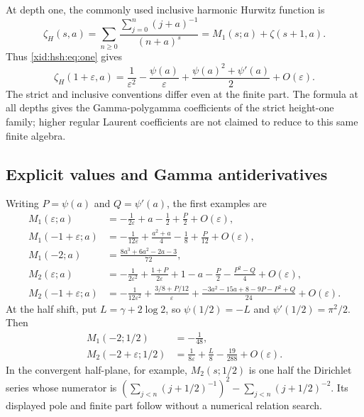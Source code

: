 \documentclass[11pt,a4paper]{article}
\numberwithin{equation}{section}
\theoremstyle{definition}
\theoremstyle{remark}
\begin{document}
At depth one, the commonly used inclusive harmonic Hurwitz function is
\[
 \zeta_H(s,a)=\sum_{n\ge0}\frac{\sum_{j=0}^{n}(j+a)^{-1}}{(n+a)^s}
            =M_1(s;a)+\zeta(s+1,a).
\]
Thus \eqref{xid:hsh:eq:one} gives
\[
 \zeta_H(1+\varepsilon,a)
 =\frac1{\varepsilon^2}-\frac{\psi(a)}{\varepsilon}
       +\frac{\psi(a)^2+\psi'(a)}2+O(\varepsilon).
\]
The strict and inclusive conventions differ even at the finite part.
The formula at all depths gives the Gamma-polygamma coefficients of the
strict height-one family; higher regular Laurent coefficients are not
claimed to reduce to this same finite algebra.

\subsection{Explicit values and Gamma antiderivatives}

Writing $P=\psi(a)$ and $Q=\psi'(a)$, the first examples are
\begin{align}
 M_1(\varepsilon;a)
  &=-\frac1{2\varepsilon}+a-\frac12+\frac P2+O(\varepsilon),
       \label{xid:hsh:eq:M10}\\
 M_1(-1+\varepsilon;a)
  &=-\frac1{12\varepsilon}
       +\frac{a^2+a}{4}-\frac18+\frac P{12}+O(\varepsilon),\\
 M_1(-2;a)&=\frac{8a^3+6a^2-2a-3}{72},
       \label{xid:hsh:eq:M12}\\
 M_2(\varepsilon;a)
  &=-\frac1{2\varepsilon^2}+\frac{1+P}{2\varepsilon}
       +1-a-\frac P2-\frac{P^2-Q}{4}+O(\varepsilon),\\
 M_2(-1+\varepsilon;a)
  &=-\frac1{12\varepsilon^2}
       +\frac{3/8+P/12}{\varepsilon}
       +\frac{-3a^2-15a+8-9P-P^2+Q}{24}
       +O(\varepsilon).\label{xid:hsh:eq:M21}
\end{align}
At the half shift, put $L=\gamma+2\log2$, so
$\psi(1/2)=-L$ and $\psi'(1/2)=\pi^2/2$. Then
\begin{align}
 M_1(-2;1/2)&=-\frac1{48},\\
 M_2(-2+\varepsilon;1/2)
       &=\frac1{8\varepsilon}+\frac L8-\frac{19}{288}
                    +O(\varepsilon).
\end{align}
In the convergent half-plane, for example,
$M_2(s;1/2)$ is one half the Dirichlet series whose numerator is
$(\sum_{j<n}(j+1/2)^{-1})^2-\sum_{j<n}(j+1/2)^{-2}$.
Its displayed pole and finite part follow without a numerical relation search.
\end{document}
